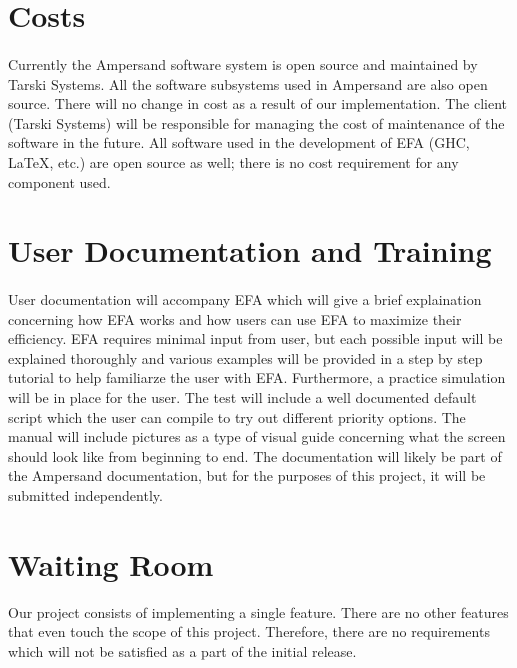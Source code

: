 \documentclass[12pt]{report}
\begin{document}
\section{Costs}\label{sec:Costs}
\paragraph*{}
Currently the Ampersand software system is open source and maintained by Tarski
Systems.  All the software subsystems used in Ampersand are also open
source. There will no change in cost as a result of our implementation. The
client (Tarski Systems) will be responsible for managing the cost of
maintenance of the software in the future. All software used in the development
of EFA (GHC, LaTeX, etc.) are open source as well; there is no cost
requirement for any component used.
\section{User Documentation and Training}\label{sec:UserDoc}
\paragraph*{}
 User documentation will accompany EFA which will give a brief explaination concerning 
how EFA works and how users can use EFA to maximize their efficiency. EFA requires minimal 
input from user, but each possible input will be explained thoroughly and various examples will be 
provided in a step by step tutorial to help familiarze the user with EFA. Furthermore, a 
practice simulation will be in place for the user. The test will include a well documented default 
script which the user can compile to try out different priority options. The manual will include 
pictures as a type of visual guide concerning what the screen should look like from beginning to 
end. The documentation will likely be part of the Ampersand documentation, but for the purposes of 
this project, it will be submitted independently. 

\section{Waiting Room}\label{sec:Waiting}
Our project consists of implementing a single feature. There are no other
features that even touch the scope of this project. Therefore, there are no
requirements which will not be satisfied as a part of the initial release.





\end{document}
